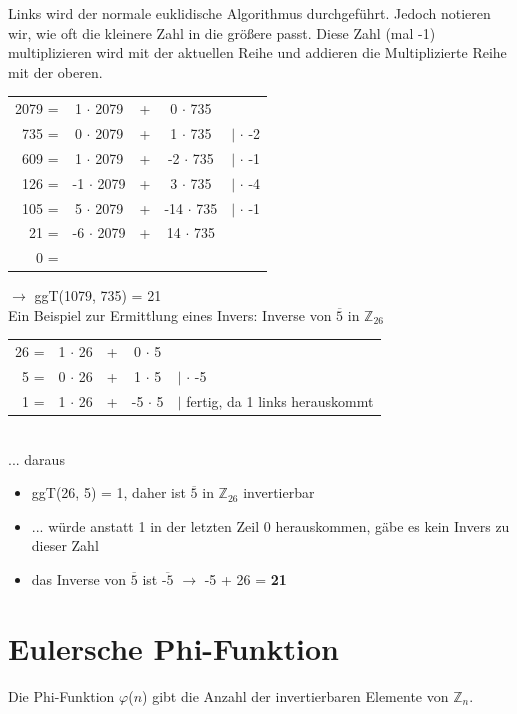 Links wird der normale euklidische Algorithmus durchgeführt. Jedoch notieren wir, wie oft die kleinere Zahl in die größere passt. Diese Zahl (mal -1) multiplizieren wird mit der aktuellen Reihe und addieren die Multiplizierte Reihe mit der oberen.

\begin{tabular}{rcccl}
	2079 = & 1 $\cdot$ 2079 & + & 0 $\cdot$ 735 &  \\
	735 = & 0 $\cdot$ 2079 & + & 1 $\cdot$ 735 & $|$ $\cdot$ -2 \\
	609 = & 1 $\cdot$ 2079 & + & -2 $\cdot$ 735 & $|$ $\cdot$ -1 \\
	126 = & -1 $\cdot$ 2079 & + & 3 $\cdot$ 735 & $|$ $\cdot$ -4 \\
	105 = & 5 $\cdot$ 2079 & + & -14 $\cdot$ 735 & $|$ $\cdot$ -1 \\
	21 = & -6 $\cdot$ 2079 & + & 14 $\cdot$ 735 & \\
	0 = &  & &  & \\
\end{tabular}

$\rightarrow$ ggT(1079, 735) = 21 \\

Ein Beispiel zur Ermittlung eines Invers: Inverse von $\overline{\text{5}}$ in $\mathbb{Z}_{26}$ \\
\begin{tabular}{rcccl}
	26 = & 1 $\cdot$ 26 & + & 0 $\cdot$ 5 &  \\
	5 = & 0 $\cdot$ 26 & + & 1 $\cdot$ 5 & $|$ $\cdot$ -5 \\
	1 = & 1 $\cdot$ 26 & + & -5 $\cdot$ 5 & $|$ fertig, da 1 links herauskommt
\end{tabular} \\
... daraus 
\begin{itemize}
	\item ggT(26, 5) = 1, daher ist $\overline{\text{5}}$ in $\mathbb{Z}_{26}$ invertierbar
	\item[] ... würde anstatt 1 in der letzten Zeil 0 herauskommen, gäbe es kein Invers zu dieser Zahl
	\item das Inverse von $\overline{\text{5}}$ ist $\overline{\text{-5}}$ $\rightarrow$ -5 + 26 = \textbf{21}
\end{itemize}

\section{Eulersche Phi-Funktion}
Die Phi-Funktion $\varphi$($n$) gibt die Anzahl der invertierbaren Elemente von $\mathbb{Z}_{n}$.

